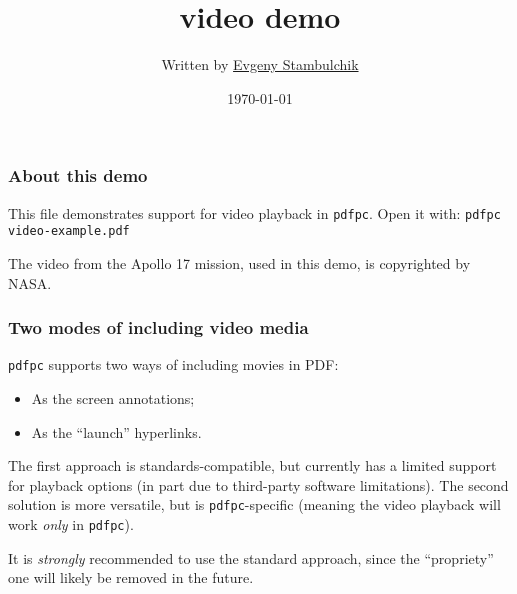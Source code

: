 \documentclass{beamer}
\title{\pdfpc video demo}
\author[E. Stambulchik]{Written by
                  \href{https://github.com/fnevgeny}{Evgeny Stambulchik}}
\date{\today}
\institute{}
\newcommand{\pdfpc}{\texttt{pdfpc}\xspace}
\newcommand{\opt}[1]{\texttt{#1}\xspace}
\begin{document}
\begin{frame}
  \titlepage
  \hypertarget{titlePage}{}
\end{frame}

\begin{frame}
  \frametitle{About this demo}

  This file demonstrates support for video playback in \pdfpc.
  Open it with: \opt{pdfpc video-example.pdf}
  
  \vfill
  
  {\small The video from the Apollo 17 mission, used in this demo, is
  copyrighted by NASA.}
  
\end{frame}

\begin{frame}
  \frametitle{Two modes of including video media}

  \pdfpc supports two ways of including movies in PDF:

  \begin{itemize}
    \item As the screen annotations;
    \item As the ``launch'' hyperlinks.
  \end{itemize}

  \begin{block}{}
    The first approach is standards-compatible, but currently has a limited
    support for playback options (in part due to third-party software
    limitations). The second solution is more versatile, but is \pdfpc-specific
    (meaning the video playback will work {\em only} in \pdfpc).
  \end{block}

  \begin{alertblock}{}
    It is {\em strongly} recommended to use the standard approach, since the
    ``propriety'' one will likely be removed in the future.
  \end{alertblock}
\end{frame}
\end{document}

